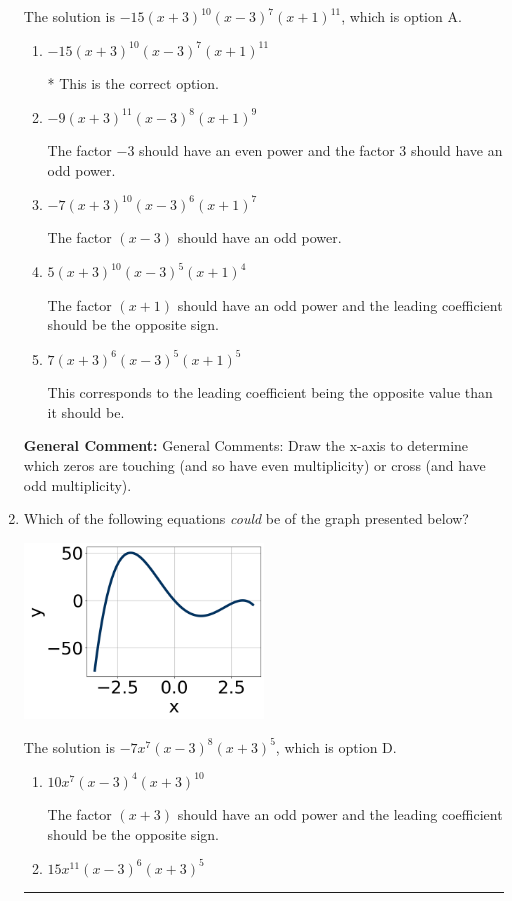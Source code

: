 \documentclass{extbook}[14pt]
\newcommand{\litem}[1]{\item #1

\rule{\textwidth}{0.4pt}}
\begin{document}
\begin{enumerate}
{The solution is \( -15(x + 3)^{10} (x - 3)^{7} (x + 1)^{11} \), which is option A.\begin{enumerate}[label=\Alph*.]
\item \( -15(x + 3)^{10} (x - 3)^{7} (x + 1)^{11} \)

* This is the correct option.
\item \( -9(x + 3)^{11} (x - 3)^{8} (x + 1)^{9} \)

The factor $-3$ should have an even power and the factor $3$ should have an odd power.
\item \( -7(x + 3)^{10} (x - 3)^{6} (x + 1)^{7} \)

The factor $(x - 3)$ should have an odd power.
\item \( 5(x + 3)^{10} (x - 3)^{5} (x + 1)^{4} \)

The factor $(x + 1)$ should have an odd power and the leading coefficient should be the opposite sign.
\item \( 7(x + 3)^{6} (x - 3)^{5} (x + 1)^{5} \)

This corresponds to the leading coefficient being the opposite value than it should be.
\end{enumerate}

\textbf{General Comment:} General Comments: Draw the x-axis to determine which zeros are touching (and so have even multiplicity) or cross (and have odd multiplicity).
}
\litem{
Which of the following equations \textit{could} be of the graph presented below?

\begin{center}
    \includegraphics[width=0.5\textwidth]{../Figures/polyGraphToFunctionCopyA.png}
\end{center}


The solution is \( -7x^{7} (x - 3)^{8} (x + 3)^{5} \), which is option D.\begin{enumerate}[label=\Alph*.]
\item \( 10x^{7} (x - 3)^{4} (x + 3)^{10} \)

The factor $(x + 3)$ should have an odd power and the leading coefficient should be the opposite sign.
\item \( 15x^{11} (x - 3)^{6} (x + 3)^{5} \)


\end{enumerate}}
\end{enumerate}
\end{document}
